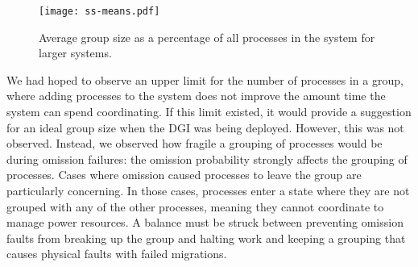 \begin{figure}
    \centering
    \texttt{[image: ss-means.pdf]}
    \caption{Average group size as a percentage of all processes in the system for larger systems.}
    \label{fig:ss-means}
\end{figure}

We had hoped to observe an upper limit for the number of processes in a group, where adding processes to the system does not improve the amount time the system can spend coordinating.
If this limit existed, it would provide a suggestion for an ideal group size when the DGI was being deployed.
However, this was not observed.
Instead, we observed how fragile a grouping of processes would be during omission failures: the omission probability strongly affects the grouping of processes.
Cases where omission caused processes to leave the group are particularly concerning. 
In those cases, processes enter a state where they are not grouped with any of the other processes, meaning they cannot coordinate to manage power resources.
A balance must be struck between preventing omission faults from breaking up the group and halting work and keeping a grouping that causes physical faults with failed migrations.




